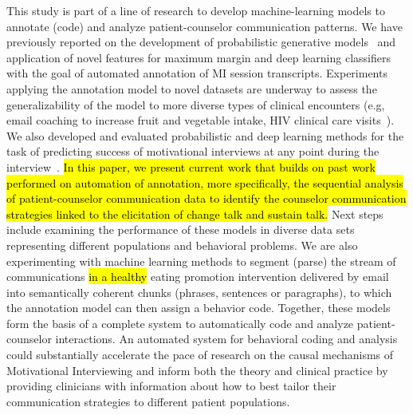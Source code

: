 \documentclass[smallextended]{svjour3}       %
\begin{document}
This study is part of a line of research to develop machine-learning models to annotate (code) and analyze patient-counselor communication patterns. We have previously reported on the development of probabilistic generative models~\cite{kotov2014towards, kotov2015interpretable} and application of novel features for maximum margin and deep learning classifiers~\cite{hasan2016study} with the goal of automated annotation of MI session transcripts. Experiments applying the annotation model to novel datasets are underway to assess the generalizability of the model to more diverse types of clinical encounters (e.g, email coaching to increase fruit and vegetable intake, HIV clinical care visits~\cite{carcone2018using}). We also developed and evaluated probabilistic and deep learning methods for the task of predicting success of motivational interviews at any point during the interview~\cite{hasan2018predicting}. \hl{In this paper, we present current work that builds on past work performed on automation of annotation, more specifically, the sequential analysis of patient-counselor communication data to identify the counselor communication strategies linked to the elicitation of change talk and sustain talk.} Next steps include examining the performance of these models in diverse data sets representing different populations and behavioral problems. We are also experimenting with machine learning methods to segment (parse) the stream of communications \hl{in a healthy} eating promotion intervention delivered by email into semantically coherent chunks (phrases, sentences or paragraphs), to which the annotation model can then assign a behavior code. Together, these models form the basis of a complete system to automatically code and analyze patient-counselor interactions. An automated system for behavioral coding and analysis could substantially accelerate the pace of research on the causal mechanisms of Motivational Interviewing and inform both the theory and clinical practice by providing clinicians with information about how to best tailor their communication strategies to different patient populations. 
\end{document}
